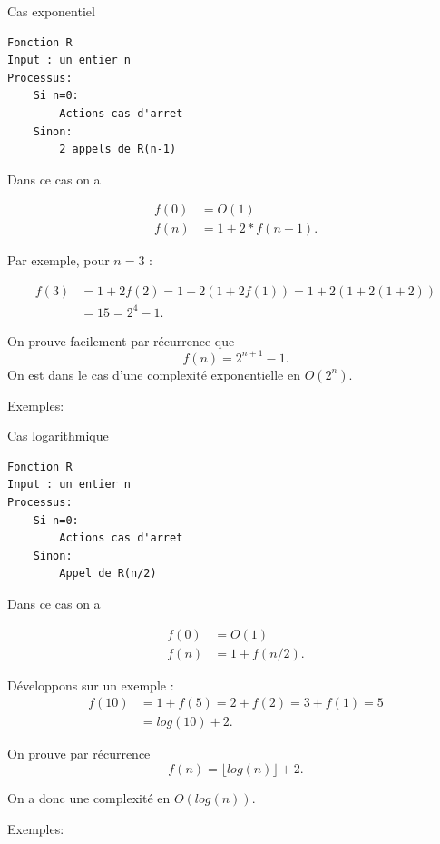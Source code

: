 \documentclass{../cours}
\begin{document}
\pagebreak

\begin{Example}
Cas exponentiel

\begin{lstlisting}
Fonction R
Input : un entier n
Processus:
    Si n=0:
        Actions cas d'arret
    Sinon:
        2 appels de R(n-1)
\end{lstlisting}

Dans ce cas on a 

\begin{align}
f(0) &= O(1) \\
f(n) &= 1 + 2*f(n-1).
\end{align}

Par exemple, pour $n=3$ :

\begin{align}
f(3) &= 1 + 2f(2) = 1 + 2(1 + 2f(1)) = 1 + 2(1 + 2(1 + 2))\\
 &= 15 = 2^4 - 1.
\end{align}

On prouve facilement par récurrence que
\begin{equation}
f(n) = 2^{n+1} - 1.
\end{equation}
On est dans le cas d'une complexité exponentielle en $O(2^n)$.

Exemples: 
\end{Example}

\begin{Example}
Cas logarithmique

\begin{lstlisting}
Fonction R
Input : un entier n
Processus:
    Si n=0:
        Actions cas d'arret
    Sinon:
        Appel de R(n/2)
\end{lstlisting}

Dans ce cas on a 

\begin{align}
f(0) &= O(1) \\
f(n) &= 1 + f(n/2).
\end{align}

Développons sur un exemple :
\begin{align}
f(10) &= 1 + f(5) = 2 + f(2) = 3 + f(1) = 5 \\
&= log(10) + 2.
\end{align}

On prouve par récurrence
\begin{equation}
f(n) = \lfloor log(n) \rfloor + 2.
\end{equation}

On a donc une complexité en $O(log(n))$.

Exemples: 
\end{Example}
\end{document}
